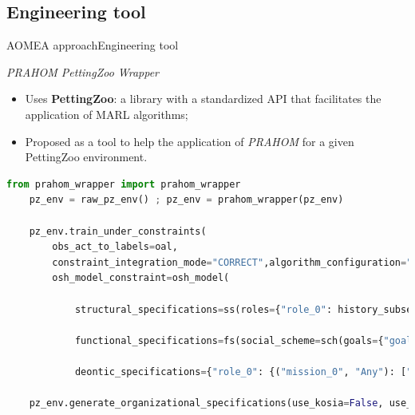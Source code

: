 \subsection{Engineering tool}

\begin{frame}[fragile]{AOMEA approach}{Engineering tool}

    \begin{block}{\emph{PRAHOM PettingZoo Wrapper}\label{PettingZoo-wrapper}}
        \begin{itemize}
            \item Uses \textbf{PettingZoo}: a library with a standardized API that facilitates the application of MARL algorithms;
            \item Proposed as a tool to help the application of \emph{PRAHOM} for a given PettingZoo environment.
        \end{itemize}
    \end{block}

    \begin{lstlisting}[language=Python,basicstyle=\scriptsize]
    from prahom_wrapper import prahom_wrapper
    pz_env = raw_pz_env() ; pz_env = prahom_wrapper(pz_env)
    
    pz_env.train_under_constraints(
        obs_act_to_labels=oal,
        constraint_integration_mode="CORRECT",algorithm_configuration="default_MAPPO"
        osh_model_constraint=osh_model(
            
            structural_specifications=ss(roles={"role_0": history_subset(pattern="[o0,a1](1,4),[o1,a2](1,2)")},role_inheritance_relations=None, root_groups=None),
            
            functional_specifications=fs(social_scheme=sch(goals={"goal_0": history_subset(pattern="[#Any](0,*),[obs_goal_0]")},missions=["mission_0"], goals_structure=None,mission_to_goals={"mission_0": ["goal_0"]},mission_to_agent_cardinality=None),social_preferences=None),

            deontic_specifications={"role_0": {("mission_0", "Any"): ["agent_0", "agent_4"]}}))

    pz_env.generate_organizational_specifications(use_kosia=False, use_gosia=True,gosia_configuration={"generate_figures": True})
    \end{lstlisting}

\end{frame}
